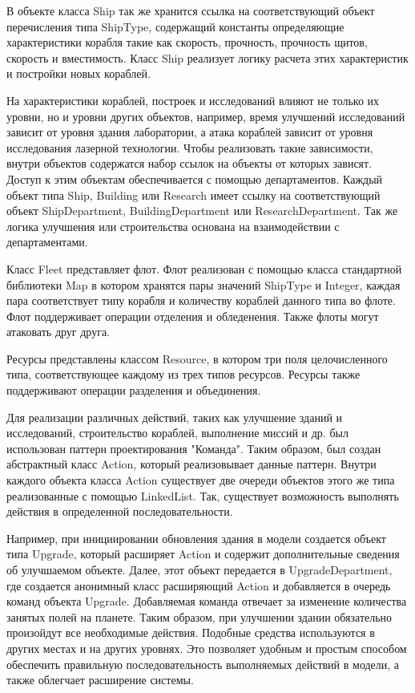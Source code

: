 В объекте класса Ship так же хранится ссылка на соответствующий объект перечисления типа ShipType, содержащий константы определяющие характеристики корабля такие как скорость, прочность, прочность щитов, скорость и вместимость. Класс Ship реализует логику расчета этих характеристик и постройки новых кораблей.

На характеристики кораблей, построек и исследований влияют не только их уровни, но и уровни других объектов, например, время улучшений исследований зависит от уровня здания лаборатории, а атака кораблей зависит от уровня исследования лазерной технологии. Чтобы реализовать такие зависимости, внутри объектов содержатся набор ссылок на объекты от которых зависят. Доступ к этим объектам обеспечивается с помощью департаментов. Каждый объект типа Ship, Building или Research имеет ссылку на соответствующий объект ShipDepartment, BuildingDepartment или ResearchDepartment. Так же логика улучшения или строительства основана на взаимодействии с департаментами.

Класс Fleet представляет флот. Флот реализован с помощью класса стандартной библиотеки Map в котором хранятся пары значений ShipType и Integer, каждая пара соответствует типу корабля и количеству кораблей данного типа во флоте. Флот поддерживает операции отделения и обледенения. Также флоты могут атаковать друг друга.

Ресурсы представлены классом Resource, в котором три поля целочисленного типа, соответствующее каждому из трех типов ресурсов. Ресурсы также поддерживают операции разделения и объединения.

Для реализации различных действий, таких как улучшение зданий и исследований, строительство кораблей, выполнение миссий и др. был использован паттерн проектирования "Команда". Таким образом, был создан абстрактный класс Action, который реализовывает данные паттерн. Внутри каждого объекта класса Action существует две очереди объектов этого же типа реализованные с помощью LinkedList. Так, существует возможность выполнять действия в определенной последовательности. 

Например, при инициировании обновления здания в модели создается объект типа Upgrade, который расширяет Action и содержит дополнительные сведения об улучшаемом объекте. Далее, этот объект передается в UpgradeDepartment, где создается анонимный класс расширяющий Action и добавляется в очередь команд объекта Upgrade. Добавляемая команда отвечает за изменение количества занятых полей на планете. Таким образом, при улучшении здании обязательно произойдут все необходимые действия. Подобные средства используются в других местах и на других уровнях. Это позволяет удобным и простым способом обеспечить правильную последовательность выполняемых действий в модели, а также облегчает расширение системы.     

